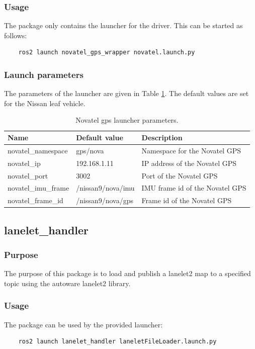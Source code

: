 \documentclass[sn-mathphys-num]{sn-jnl}%
\begin{document}
\subsubsection{Usage}
The package only contains the launcher for the driver. This can be started as follows:
\begin{lstlisting}
    ros2 launch novatel_gps_wrapper novatel.launch.py
\end{lstlisting}
\subsubsection{Launch parameters}
The parameters of the launcher are given in Table \ref{tab:novatel_gps_wrapper}. The default values are set for the Nissan leaf vehicle.
\begin{table}[!h]
    \captionsetup{justification=centering}
    \normalsize
    \caption{\label{tab:novatel_gps_wrapper} Novatel gps launcher parameters.}
    \begin{tabular}{| l | l | l |}
        \hline
        \textbf{Name} & \textbf{Default value} & \textbf{Description} \\
        \hline
        novatel\_namespace  & gps/nova          & Namespace for the Novatel GPS \\
        \hline
        novatel\_ip         & 192.168.1.11      & IP address of the Novatel GPS \\
        \hline
        novatel\_port       & 3002              & Port of the Novatel GPS \\
        \hline
        novatel\_imu\_frame & /nissan9/nova/imu & IMU frame id of the Novatel GPS \\
        \hline
        novatel\_frame\_id  & /nissan9/nova/gps & Frame id of the Novatel GPS \\
        \hline
    \end{tabular}
\end{table}


\subsection{lanelet\_handler}
\subsubsection{Purpose}
The purpose of this package is to load and publish a lanelet2 map to a specified topic using the autoware lanelet2 library.
\subsubsection{Usage}
The package can be used by the provided launcher:
\begin{lstlisting}
    ros2 launch lanelet_handler laneletFileLoader.launch.py
\end{lstlisting}
\end{document}
